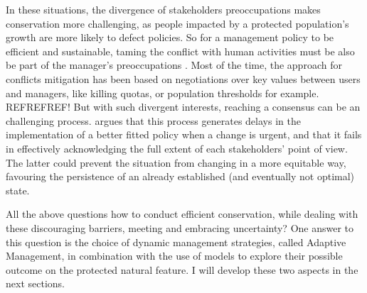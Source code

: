 \documentclass[12pt,a4paper]{article}
\begin{document}
In these situations, the divergence of stakeholders preoccupations makes conservation more challenging, as people impacted by a protected population's growth are more likely to defect policies.
So for a management policy to be efficient and sustainable, taming the conflict with human activities must be also be part of the manager's preoccupations \citep{redpath2013understanding}.
Most of the time, the approach for conflicts mitigation has been based on negotiations over key values between users and managers, like killing quotas, or population thresholds for example. REFREFREF!
But with such divergent interests, reaching a consensus can be an challenging process.
\cite{peterson2005conservation} argues that this process generates delays in the implementation of a better fitted policy when a change is urgent, and that it %
fails in effectively acknowledging the full extent of each stakeholders' point of view.
The latter could prevent the situation from changing in a more equitable way, favouring the persistence of an already established (and eventually not optimal) state.

All the above questions how to conduct efficient conservation, while dealing with these discouraging barriers, meeting and embracing uncertainty?
One answer to this question is the choice of dynamic management strategies, called Adaptive Management, in combination with the use of models to explore their possible outcome on the protected natural feature.
I will develop these two aspects in the next sections.  
%
\end{document}
